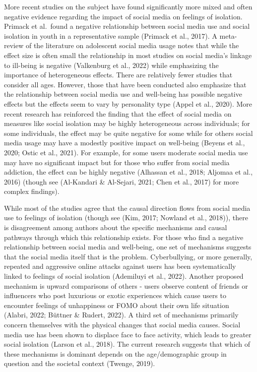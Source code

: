 \documentclass[]{interact}
\theoremstyle{plain}%
\theoremstyle{definition}
\theoremstyle{remark}
\begin{document}
More recent studies on the subject have found significantly more mixed
and often negative evidence regarding the impact of social media on
feelings of isolation. Primack et al.~found a negative relationship
between social media use and social isolation in youth in a
representative sample (Primack et al., 2017). A meta-review of the
literature on adolescent social media usage notes that while the effect
size is often small the relationship in most studies on social media's
linkage to ill-being is negative (Valkenburg et al., 2022) while
emphasizing the importance of heterogeneous effects. There are
relatively fewer studies that consider all ages. However, those that
have been conducted also emphasize that the relationship between social
media use and well-being has possible negative effects but the effects
seem to vary by personality type (Appel et al., 2020). More recent
research has reinforced the finding that the effect of social media on
measures like social isolation may be highly heterogeneous across
individuals; for some individuals, the effect may be quite negative for
some while for others social media usage may have a modestly positive
impact on well-being (Beyens et al., 2020; Ostic et al., 2021). For
example, for some users moderate social media use may have no
significant impact but for those who suffer from social media addiction,
the effect can be highly negative (Alhassan et al., 2018; Aljomaa et
al., 2016) (though see (Al-Kandari \& Al-Sejari, 2021; Chen et al.,
2017) for more complex findings).

While most of the studies agree that the causal direction flows from
social media use to feelings of isolation (though see (Kim, 2017;
Nowland et al., 2018)), there is disagreement among authors about the
specific mechanisms and causal pathways through which this relationship
exists. For those who find a negative relationship between social media
and well-being, one set of mechanisms suggests that the social media
itself that is the problem. Cyberbullying, or more generally, repeated
and aggressive online attacks against users has been systematically
linked to feelings of social isolation (Ademiluyi et al., 2022). Another
proposed mechanism is upward comparisons of others - users observe
content of friends or influencers who post luxurious or exotic
experiences which cause users to encounter feelings of unhappiness or
FOMO about their own life situation (Alabri, 2022; Büttner \& Rudert,
2022). A third set of mechanisms primarily concern themselves with the
physical changes that social media causes. Social media use has been
shown to displace face to face activity, which leads to greater social
isolation (Larson et al., 2018). The current research suggests that
which of these mechanisms is dominant depends on the age/demographic
group in question and the societal context (Twenge, 2019).
\end{document}
